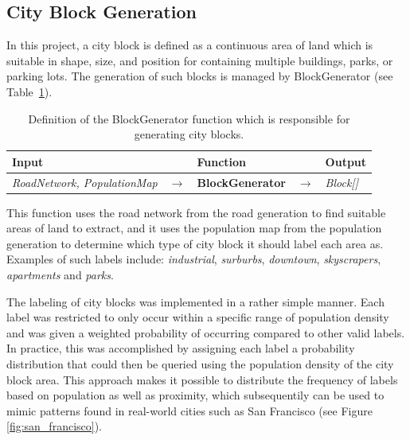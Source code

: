 \subsection{City Block Generation}

In this project, a city block is defined as a continuous area of land which is suitable in shape, size, and position for containing multiple buildings, parks, or parking lots.
The generation of such blocks is managed by BlockGenerator (see Table~\ref{table:blockgen}).

\begin{table}[H]
  \centering
  \begin{tabular}{lllll}
    \textbf{Input}                           &               & \textbf{Function}            &               & \textbf{Output}         \\
    \midrule
    \textit{RoadNetwork, PopulationMap}      & $\rightarrow$ & \textbf{BlockGenerator}      & $\rightarrow$ & \textit{Block[]}        \\
    \bottomrule
  \end{tabular}

  \caption{Definition of the BlockGenerator function which is responsible for generating city blocks.}
  \label{table:blockgen}
\end{table}
\vspace{-0.4cm} %

This function uses the road network from the road generation to find suitable areas of land to extract, and it uses the population map from the population generation to determine which type of city block it should label each area as.
Examples of such labels include: \textit{industrial}, \textit{surburbs}, \textit{downtown}, \textit{skyscrapers}, \textit{apartments} and \textit{parks}.

The labeling of city blocks was implemented in a rather simple manner.
Each label was restricted to only occur within a specific range of population density and was given a weighted probability of occurring compared to other valid labels.
In practice, this was accomplished by assigning each label a probability distribution that could then be queried using the population density of the city block area.
This approach makes it possible to distribute the frequency of labels based on population as well as proximity, which subsequentily can be used to mimic patterns found in real-world cities such as San Francisco (see Figure \ref{fig:san_francisco}).

